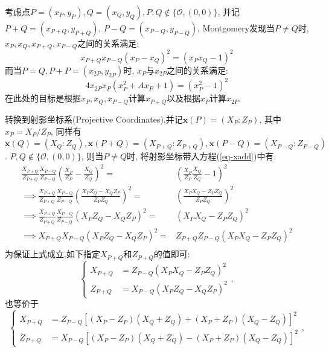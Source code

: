 考虑点$P=(x_P,y_P), Q = (x_Q, y_Q), P, Q \notin \{\mathcal{O}, (0,0)\}$,
并记$P+Q = (x_{P+Q}, y_{P+Q})$, $P-Q = (x_{P-Q}, y_{P-Q})$, Montgomery发现当$P\neq Q$时,
$x_P, x_Q, x_{P+Q}, x_{P-Q}$之间的关系满足:
\begin{equation}\label{eq-xadd}
x_{P+Q}x_{P-Q}(x_P - x_Q)^2 = (x_Px_Q - 1)^2
\end{equation}
而当$P=Q, P+P = (x_{2P}, y_{2P})$时, $x_P$与$x_{2P}$之间的关系满足:
\begin{equation}\label{eq-xdbl}
4x_{2P}x_P(x_P^2 + Ax_P + 1) = (x_P^2 - 1)^2
\end{equation}
在此处的目标是根据$x_P, x_Q, x_{P-Q}$计算$x_{P+Q}$以及根据$x_P$计算$x_{2P}$.

转换到射影坐标系(Projective Coordinates),并记$\mathbf{x}(P) = (X_P : Z_P)$, 其中$x_P = X_P/Z_P$,
同样有$\mathbf{x}(Q)=(X_Q : Z_Q), \mathbf{x}(P+Q) = (X_{P+Q} : Z_{P+Q}), 
\mathbf{x}(P-Q) = (X_{P-Q} : Z_{P-Q})$. $P, Q \notin \{\mathcal{O}, (0,0)\}$, 则当$P\neq Q$时,
将射影坐标带入方程(\ref{eq-xadd})中有:
\begin{equation*}
\begin{array}{rl}
\frac{X_{P+Q}}{Z_{P+Q}}\frac{X_{P-Q}}{Z_{P-Q}}\left(\frac{X_{P}}{Z_{P}}  - \frac{X_{Q}}{Z_{Q}}\right)^2 = & \left(\frac{X_{P}}{Z_{P}}\frac{X_{Q}}{Z_{Q}} -1\right)^2 \\
\implies \frac{X_{P+Q}}{Z_{P+Q}}\frac{X_{P-Q}}{Z_{P-Q}}\left(\frac{X_PZ_Q - X_QZ_P}{Z_PZ_Q}\right)^2 = & \left(\frac{X_PX_Q - Z_PZ_Q}{Z_PZ_Q}\right)^2 \\
\implies \frac{X_{P+Q}}{Z_{P+Q}}\frac{X_{P-Q}}{Z_{P-Q}}\left(X_PZ_Q - X_QZ_P\right)^2 = & \left(X_PX_Q - Z_PZ_Q\right)^2 \\
\implies X_{P+Q}X_{P-Q}\left(X_PZ_Q - X_QZ_P\right)^2 = & Z_{P+Q}Z_{P-Q}\left(X_PX_Q - Z_PZ_Q\right)^2 \\
\end{array}
\end{equation*}
为保证上式成立,如下指定$X_{P+Q}$和$Z_{P+Q}$的值即可:
\begin{equation*}
\left\{
\begin{array}{ll}
X_{P+Q} & = Z_{P-Q}\left(X_PX_Q - Z_PZ_Q\right)^2\\
Z_{P+Q} & = X_{P-Q}\left(X_PZ_Q - X_QZ_P\right)^2
\end{array},
\right.
\end{equation*}
也等价于
\begin{equation}\label{eq-xadd2}
\left\{
\begin{array}{ll}
X_{P+Q} & = Z_{P-Q}\left[ (X_P-Z_P)(X_Q+Z_Q) + (X_P+Z_P)(X_Q-Z_Q)  \right]^2\\
Z_{P+Q} & = X_{P-Q}\left[ (X_P-Z_P)(X_Q+Z_Q) - (X_P + Z_P)(X_Q-Z_Q)  \right]^2
\end{array},
\right.
\end{equation}
